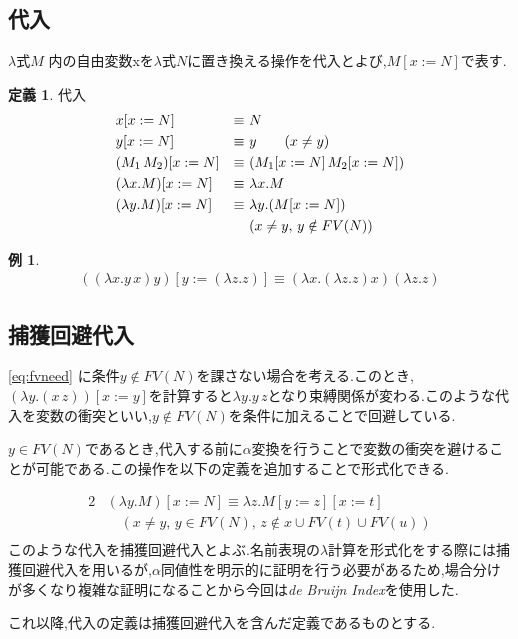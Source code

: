 \documentclass[a4j,10pt]{jsarticle}
\theoremstyle{definition}
\newtheorem{definition}{定義}
\newtheorem*{example*}{例}
\begin{document}
\subsection*{代入}
\(\lambda\)式\( M \) 内の自由変数xを\(\lambda\)式\(N\)に置き換える操作を代入とよび,$M [x:= N]$で表す.
\begin{definition}
代入
\begin{alignat}{2}
& x[x:=N] &\equiv\ & N\\
& y[x:=N] &\equiv\ & y \hspace{20pt} (x \neq y)\\
& (M_1\, M_2)[x:= N] &\equiv\ & (M_1[x:= N]\, M_2[x:= N])\\
& (\lambda x. M)[x:= N] &\equiv\ & \lambda x.M\\
& (\lambda y. M)[x:= N] &\equiv\ & \lambda y. (M[x:= N]) \notag \\
& & & (x \neq y,\, y \notin FV(N)) \label{eq:fvneed}
\end{alignat}
\end{definition}
\begin{example*}
\begin{align}
((\lambda x. y\, x)y)[y:= (\lambda z.z)] \equiv (\lambda x. (\lambda z. z) x)(\lambda z. z)
\end{align}
\end{example*}
\subsection*{捕獲回避代入}\label{subst}
\eqref{eq:fvneed} に条件$y \notin FV(N)$を課さない場合を考える.このとき,$(\lambda y. (x\, z))[x:= y] $を計算すると$\lambda y. y\, z$となり束縛関係が変わる.このような代入を変数の衝突といい,$y \notin FV(N)$を条件に加えることで回避している.\par
$y \in FV(N)$であるとき,代入する前に$\alpha$変換を行うことで変数の衝突を避けることが可能である.この操作を以下の定義を追加することで形式化できる.\par
\begin{alignat}{2}
    & (\lambda y. M)[x := N] \equiv \lambda z. M[y := z][x:= t]\\
    & \hspace{12pt} (x \neq y,\, y \in FV(N),\, z \notin {x} \cup FV(t)\cup FV(u))\\
\end{alignat}
このような代入を捕獲回避代入とよぶ.名前表現の\(\lambda\)計算を形式化をする際には捕獲回避代入を用いるが,\(\alpha\)同値性を明示的に証明を行う必要があるため,場合分けが多くなり複雑な証明になることから今回は{\sl de Bruijn Index}を使用した.\par
これ以降,代入の定義は捕獲回避代入を含んだ定義であるものとする.
\end{document}

